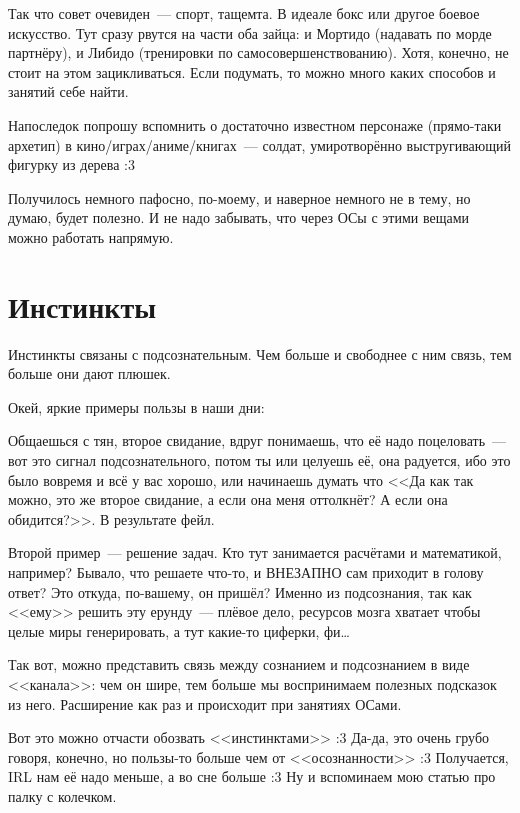 \documentclass[a5paper,12pt,twoside]{memoir}
\begin{document}
Так что совет очевиден~--- спорт, тащемта. В идеале бокс или другое боевое искусство. Тут сразу рвутся на части оба зайца: и Мортидо (надавать по морде партнёру), и Либидо (тренировки по самосовершенствованию). Хотя, конечно, не стоит на этом зацикливаться. Если подумать, то можно много каких способов и занятий себе найти. 

Напоследок попрошу вспомнить о достаточно известном персонаже (прямо-таки архетип) в ки\-но/иг\-рах/а\-ни\-ме/кни\-гах~--- сол\-дат, умиротворённо выстругивающий фигурку из дерева :3

Получилось немного пафосно, по-моему, и наверное немного не в тему, но думаю, будет полезно. И не надо забывать, что через ОСы с этими вещами можно работать напрямую. 




\section{Инстинкты}
Инстинкты связаны с подсознательным. Чем больше и свободнее с ним связь, тем больше они дают плюшек.
 
Окей, яркие примеры пользы в наши дни:

Общаешься с тян, второе свидание, вдруг понимаешь, что её надо поцеловать~--- вот это сигнал подсознательного, потом ты или целуешь её, она радуется, ибо это было вовремя и всё у вас хорошо, или начинаешь думать что <<Да как так можно, это же второе свидание, а если она меня оттолкнёт? А если она обидится?>>. В результате фейл. 

Второй пример~--- решение задач. Кто тут занимается расчётами и математикой, например? Бывало, что решаете что-то, и ВНЕЗАПНО сам приходит в голову ответ? Это откуда, по-вашему, он пришёл? Именно из подсознания, так как <<ему>> решить эту ерунду~--- плёвое дело, ресурсов мозга хватает чтобы целые миры генерировать, а тут какие-то циферки, фи\ldots
 
Так вот, можно представить связь между сознанием и подсознанием в виде <<канала>>: чем он шире, тем больше мы воспринимаем полезных подсказок из него. Расширение как раз и происходит при занятиях ОСами. 

Вот это можно отчасти обозвать <<инстинктами>> :3 Да-да, это очень грубо говоря, конечно, но пользы-то больше чем от <<осознанности>> :3 Получается, IRL нам её надо меньше, а во сне больше :3 Ну и вспоминаем мою статью про палку с колечком. 

\bigskip

\end{document}
